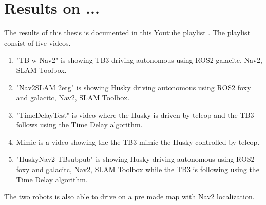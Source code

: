 \chapter{Results on ...}


The results of this thesis is documented in this Youtube playlist \cite{youtube_playlist_results}. The playlist consist of five videos. 
\begin{enumerate}
    \item "TB w Nav2" is showing TB3 driving autonomous using ROS2 galacitc, Nav2, SLAM Toolbox. 
    \item "Nav2SLAM 2etg" is showing Husky driving autonomous using ROS2 foxy and galacitc, Nav2, SLAM Toolbox. 
    \item "TimeDelayTest" is video where the Husky is driven by teleop and the TB3 follows using the Time Delay algorithm. 
    \item Mimic is a video showing the the TB3 mimic the Husky controlled by teleop. 
    \item "HuskyNav2 TBsubpub" is showing Husky driving autonomous using ROS2 foxy and galacitc, Nav2, SLAM Toolbox while the TB3 is following using the Time Delay algorithm. 
\end{enumerate}
The two robots is also able to drive on a pre made map with Nav2 localization. 


